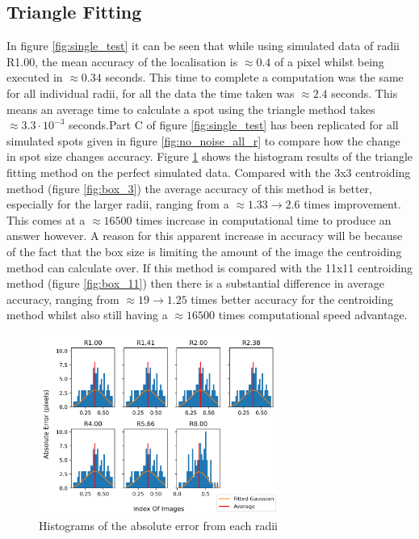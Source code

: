 \documentclass[aps,pra,a4paper,nofootinbib,onecolumn,tightenlines,longbibliography,12pt,amsfonts,amssymb,amsmath,floatfix]{revtex4-2} %
\begin{document}
  \subsection{Triangle Fitting} %
  \label{sub:Triangle Fitting}

  In figure \ref{fig:single_test} it can be seen that while using simulated data of radii R1.00, the mean accuracy of the 
  localisation is $\approx 0.4$ of a pixel whilst being executed in $\approx 0.34$ seconds. This time to complete a computation 
  was the same for all individual radii, for all the data the time taken was $\approx 2.4$ seconds. This means an 
  average time to calculate a spot using the triangle method takes $\approx 3.3\cdot 10^{-3}$ seconds.Part C of 
  figure \ref{fig:single_test} has been replicated for all simulated spots given in figure \ref{fig:no_noise_all_r}
  to compare how the change in spot size changes accuracy.
  Figure \ref{fig:distro} shows the histogram results of the triangle fitting method on the perfect simulated data. 
  Compared with the 3x3 centroiding method (figure \ref{fig:box_3}) the average accuracy of this method is better, especially for the 
  larger radii, ranging from a $\approx 1.33\rightarrow 2.6$ times improvement. This comes at a $\approx 16500$ times 
  increase in computational time to produce an answer however. A reason for this apparent increase in accuracy will be 
  because of the fact that the box size is limiting the amount of the image the centroiding method can calculate over.
  If this method is compared with the 11x11 centroiding method (figure \ref{fig:box_11}) then there is a substantial 
  difference in average accuracy, ranging from $\approx 19 \rightarrow 1.25$ times better accuracy for the centroiding 
  method whilst also still having a $\approx 16500$ times computational speed advantage.

  \begin{figure}[H]
    \begin{center}
      \includegraphics[width=0.7\textwidth]{project_pics/distro.png}
    \end{center}
    \caption{Histograms of the absolute error from each radii}
    \label{fig:distro}
  \end{figure}
\end{document}
